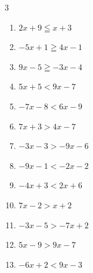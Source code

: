 \begin{multicols}{3}
\begin{enumerate}
        \phantom{$\displaystyle x\geqq 0$}

  \item $2x+9\leqq x+3$

        \phantom{$\displaystyle x\leqq -6$}

  \item $-5x+1\geqq 4x-1$


  \item $9x-5\geqq -3x-4$


  \item $5x+5<9x-7$

        \phantom{$\displaystyle x>3$}

  \item $-7x-8<6x-9$


  \item $7x+3>4x-7$


\columnbreak %

\resetques

  \item $-3x-3>-9x-6$


  \item $-9x-1<-2x-2$


  \item $-4x+3<2x+6$


  \item $7x-2>x+2$


  \item $-3x-5>-7x+2$


  \item $5x-9>9x-7$


  \item $-6x+2<9x-3$


\end{enumerate}
\end{multicols}
